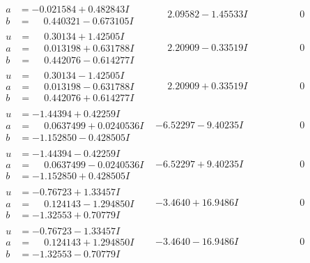 \documentclass[1p]{elsarticle_modified}
\theoremstyle{definition}
\begin{document}
$$\begin{array}{c|c|c}
\begin{aligned}
a &= -0.021584 + 0.482843 I \\
b &= \phantom{-}0.440321 - 0.673105 I\end{aligned}
 & \phantom{-}2.09582 - 1.45533 I & \phantom{-0.000000 } 0 \\ \hline\begin{aligned}
u &= \phantom{-}0.30134 + 1.42505 I \\
a &= \phantom{-}0.013198 + 0.631788 I \\
b &= \phantom{-}0.442076 - 0.614277 I\end{aligned}
 & \phantom{-}2.20909 - 0.33519 I & \phantom{-0.000000 } 0 \\ \hline\begin{aligned}
u &= \phantom{-}0.30134 - 1.42505 I \\
a &= \phantom{-}0.013198 - 0.631788 I \\
b &= \phantom{-}0.442076 + 0.614277 I\end{aligned}
 & \phantom{-}2.20909 + 0.33519 I & \phantom{-0.000000 } 0 \\ \hline\begin{aligned}
u &= -1.44394 + 0.42259 I \\
a &= \phantom{-}0.0637499 + 0.0240536 I \\
b &= -1.152850 - 0.428505 I\end{aligned}
 & -6.52297 - 9.40235 I & \phantom{-0.000000 } 0 \\ \hline\begin{aligned}
u &= -1.44394 - 0.42259 I \\
a &= \phantom{-}0.0637499 - 0.0240536 I \\
b &= -1.152850 + 0.428505 I\end{aligned}
 & -6.52297 + 9.40235 I & \phantom{-0.000000 } 0 \\ \hline\begin{aligned}
u &= -0.76723 + 1.33457 I \\
a &= \phantom{-}0.124143 - 1.294850 I \\
b &= -1.32553 + 0.70779 I\end{aligned}
 & -3.4640 + 16.9486 I & \phantom{-0.000000 } 0 \\ \hline\begin{aligned}
u &= -0.76723 - 1.33457 I \\
a &= \phantom{-}0.124143 + 1.294850 I \\
b &= -1.32553 - 0.70779 I\end{aligned}
 & -3.4640 - 16.9486 I & \phantom{-0.000000 } 0 \\ \hline\begin{aligned}

\end{aligned}
\end{array}$$
\end{document}
